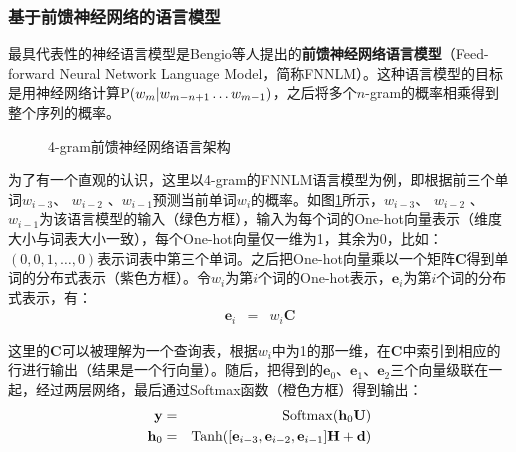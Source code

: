 
\subsubsection{基于前馈神经网络的语言模型}

\parinterval  最具代表性的神经语言模型是Bengio等人提出的{\small\sffamily\bfseries{前馈神经网络语言模型}}（Feed-forward Neural Network Language Model，简称FNNLM）。这种语言模型的目标是用神经网络计算$ {\rm P}(w_m|w_{m-n+1}\dots w_{m-1}) $，之后将多个$n$-gram的概率相乘得到整个序列的概率\cite{bengio2003neural}。

\begin{figure}[htp]
\centering

\caption{4-gram前馈神经网络语言架构}
\label{fig:5-60}
\end{figure}

\parinterval  为了有一个直观的认识，这里以4-gram的FNNLM语言模型为例，即根据前三个单词$ w_{i-3} $、 $ w_{i-2} $ 、$ w_{i-1} $预测当前单词$ w_i $的概率。如图\ref{fig:5-60}所示，$ w_{i-3} $、 $ w_{i-2} $ 、$ w_{i-1} $为该语言模型的输入（绿色方框），输入为每个词的One-hot向量表示（维度大小与词表大小一致），每个One-hot向量仅一维为1，其余为0，比如：$ (0,0,1,\dots,0) $表示词表中第三个单词。之后把One-hot向量乘以一个矩阵$ \mathbf C $得到单词的分布式表示（紫色方框）。令$ w_i $为第$ i $个词的One-hot表示，$ \mathbf e_i $为第$ i $个词的分布式表示，有：
\begin{eqnarray}
\mathbf e_i&=&w_i\mathbf C
\label{eq:5-60}
\end{eqnarray}

\noindent  这里的$ \mathbf C $可以被理解为一个查询表，根据$ w_i $中为1的那一维，在$ \mathbf C $中索引到相应的行进行输出（结果是一个行向量）。随后，把得到的$ \mathbf e_0 $、$ \mathbf e_1 $、$ \mathbf e_2 $三个向量级联在一起，经过两层网络，最后通过Softmax函数（橙色方框）得到输出：
\begin{eqnarray}
\mathbf y&=&{\rm{Softmax}}(\mathbf h_0\mathbf U)\label{eq:5-61}\\
\mathbf h_0&=&{\rm{Tanh}}([\mathbf e_{i-3},\mathbf e_{i-2},\mathbf e_{i-1}]\mathbf H+\mathbf d)
\label{eq:5-62}
\end{eqnarray}

